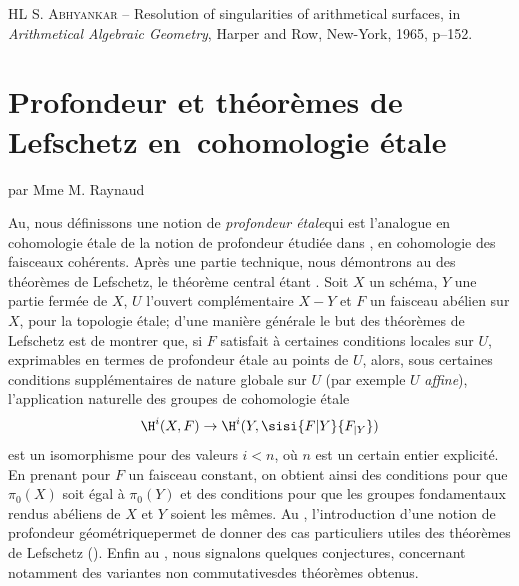 \begin{thebibliography}{HL}
 
{%
\textsc{S. Abhyankar} -- {\og Resolution of singularities of arithmetical surfaces\fg}, in \emph{Arithmetical Algebraic Geometry}, Harper and Row, New-York, 1965, p--152.
}

\end{thebibliography}

\chapter[Profondeur et th\'eor\`emes de Lefschetz]
{Profondeur et th\'eor\`emes de Lefschetz en~cohomologie \'etale} \label{XIV}
\begin{center}
par Mme M. Raynaud
\end{center}

\vspace*{1cm}
Au\pageoriginale \numero {}, nous d\'efinissons une notion de \og \textit{profondeur \'etale}\fg qui est l'analogue en cohomologie \'etale de la notion de profondeur \'etudi\'ee dans , en cohomologie des faisceaux coh\'erents. Apr\`es une partie technique, nous d\'emontrons au \numero {} des \og th\'eor\`emes de Lefschetz\fg, le th\'eor\`eme central \'etant . Soit $X$ un sch\'ema, $Y$ une partie ferm\'ee de $X$, $U$ l'ouvert compl\'ementaire $X-Y$ et $F$ un faisceau ab\'elien sur $X$, pour la topologie \'etale; d'une mani\`ere g\'en\'erale le but des th\'eor\`emes de Lefschetz est de montrer que, si $F$ satisfait \`a certaines conditions locales sur $U$, exprimables en termes de profondeur \'etale au points de $U$, alors, sous certaines conditions suppl\'ementaires de nature globale sur $U$ (par exemple $U$ \textit{affine}), l'application naturelle des groupes de cohomologie \'etale
$$
\H^i(X, F)\to \H^i(Y, \sisi{F{|Y}}{F_{|Y}})$$
est un isomorphisme pour des valeurs $i<n$, o\`u $n$ est un certain entier explicit\'e. En prenant pour $F$ un faisceau constant, on obtient ainsi des conditions pour que $\pi_0(X)$ soit \'egal \`a $\pi_0(Y)$ et des conditions pour que les groupes fondamentaux rendus ab\'eliens de $X$ et $Y$ soient les m\^emes. Au \numero {}, l'introduction d'une notion de \og profondeur g\'eom\'etrique\fg permet de donner des cas particuliers utiles des th\'eor\`emes de Lefschetz (). Enfin au \numero {}, nous signalons quelques conjectures, concernant notamment des variantes \og non commutatives\fg des th\'eor\`emes obtenus.


